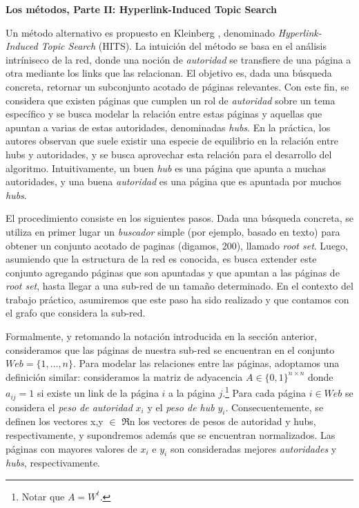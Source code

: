 \vskip 5pt
\noindent\textbf{Los m\'etodos, Parte II: Hyperlink-Induced Topic Search}
\vskip 5pt

Un m\'etodo alternativo es propuesto en Kleinberg \cite{Kleinberg}, denominado \emph{Hyperlink-Induced Topic Search} (HITS). La 
intuici\'on del m\'etodo se basa en el an\'alisis intr\'iniseco de la red, donde una noci\'on de \emph{autoridad} se 
transfiere de una p\'agina a otra mediante los links que las relacionan. El objetivo es, dada una b\'usqueda concreta,
retornar un subconjunto acotado de p\'aginas relevantes. Con este fin, se considera que existen p\'aginas que cumplen un 
rol de \emph{autoridad} sobre un tema espec\'ifico y se busca modelar la relaci\'on entre estas p\'aginas y aquellas que 
apuntan a varias de estas autoridades, denominadas \emph{hubs}. En la pr\'actica, los autores observan que suele existir
una especie de equilibrio en la relaci\'on entre hubs y autoridades, y se busca aprovechar esta relaci\'on para el desarrollo
del algoritmo. Intuitivamente, un buen \emph{hub} es una p\'agina que apunta a muchas autoridades, y una buena \emph{autoridad}
es una p\'agina que es apuntada por muchos \emph{hubs}.

El procedimiento consiste en los siguientes pasos. Dada una b\'usqueda concreta, se utiliza en primer lugar un \emph{buscador}
simple (por ejemplo, basado en texto) para obtener un conjunto acotado de paginas (digamos, 200), llamado \emph{root set}. 
Luego, asumiendo que la estructura de la red es conocida, es busca extender este conjunto agregando p\'aginas que son apuntadas
y que apuntan a las p\'aginas de \emph{root set}, hasta llegar a una sub-red de un tama\~no determinado. En el contexto del
trabajo pr\'actico, asumiremos que este paso ha sido realizado y que contamos con el grafo que considera la sub-red.

Formalmente, y retomando la notaci\'on introducida en la secci\'on anterior, consideramos que las p\'aginas de nuestra sub-red
se encuentran en el conjunto $Web = \{1,\dots,n\}$. Para modelar las relaciones entre las p\'aginas, adoptamos una definici\'on 
similar: consideramos la matriz de adyacencia $A \in \{0,1\}^{n \times n}$ donde $a_{ij} = 1$ si existe un link de la p\'agina
$i$ a la p\'agina $j$.\footnote{Notar que $A = W^t$.} Para cada p\'agina $i \in Web$ se considera el \emph{peso de autoridad} $x_i$ 
y el \emph{peso de hub} $y_i$. Consecuentemente, se definen los vectores x,y $\in$ $\Re$n los vectores de pesos de autoridad
y hubs, respectivamente, y supondremos adem\'as que se encuentran normalizados. Las p\'aginas con mayores valores de $x_i$ e $y_i$
son consideradas mejores \emph{autoridades} y \emph{hubs}, respectivamente.

